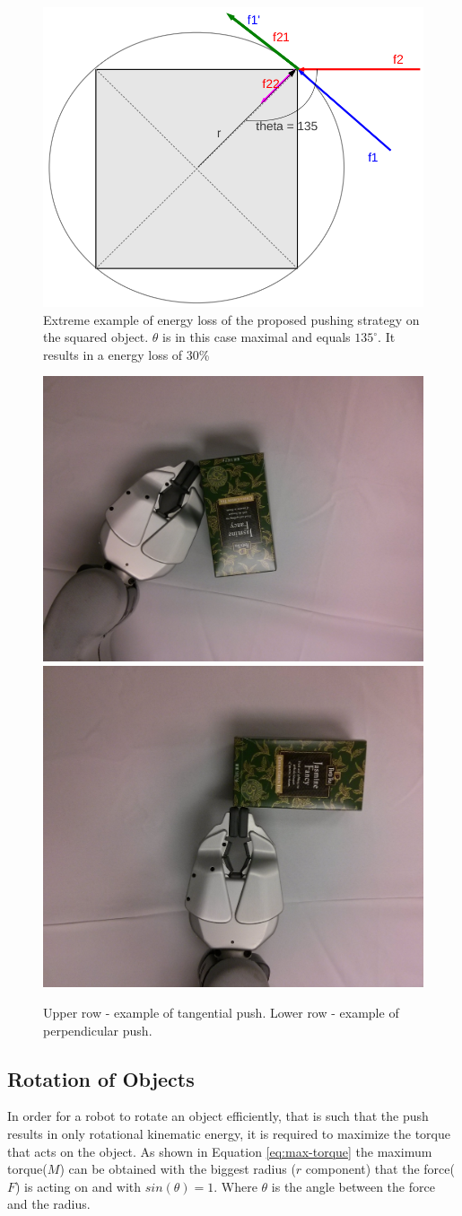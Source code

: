 \begin{figure}
\centering
 

\includegraphics[width=0.5\columnwidth]{figures/square-angle.png}


\caption{Extreme example of energy loss of the proposed pushing strategy on the squared object. $\theta$ is in this case maximal and equals $135 ^\circ$. It results in a energy loss of 30\%  }
\label{fig:angles-square}
\end{figure}

\begin{figure}
\centering 

\includegraphics[width=0.4\columnwidth]{figures/peets-tangential.jpg}\\
\includegraphics[width=0.4\columnwidth]{figures/peets-perpendicular.jpg}\\


\caption{Upper row - example of tangential push. Lower row - example of perpendicular push.}
\label{fig:tangential-example}
\end{figure}


\subsection{Rotation of Objects}
In order for a robot to rotate an object efficiently, that is such that the push results in only rotational kinematic energy, it is required to maximize the torque that acts on the object. As shown in Equation \ref{eq:max-torque} the maximum torque($M$) can be obtained with the biggest radius ($r$ component) that the force($F$) is acting on and with $sin(\theta) = 1$. Where $\theta$ is the angle between the force and the radius.

